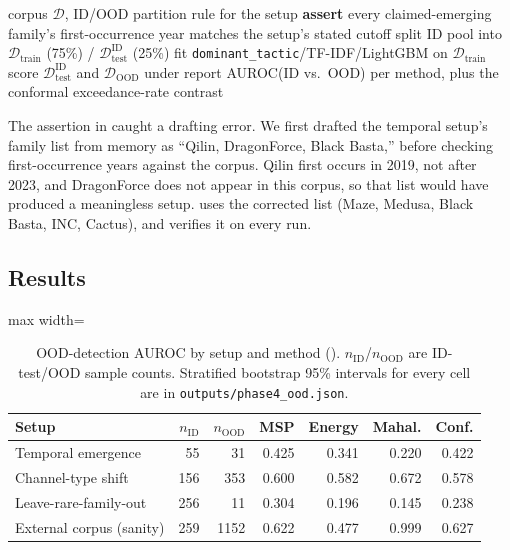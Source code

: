 \documentclass[preprint,12pt]{elsarticle}
\newenvironment{fittable}{\begin{adjustbox}{max width=\textwidth}}{\end{adjustbox}}
\begin{document}
\begin{algorithm}[htbp]
\caption{OOD setup evaluation}
\label{alg:ood-verify}
\begin{algorithmic}[1]
\Require corpus $\mathcal{D}$, ID/OOD partition rule for the setup
\State \textbf{assert} every claimed-emerging family's first-occurrence year matches the setup's stated cutoff 
\State split ID pool into $\mathcal{D}_{\mathrm{train}}$ (75\%) / $\mathcal{D}_{\mathrm{test}}^{\mathrm{ID}}$ (25\%)
\State fit \texttt{dominant\_tactic}/TF-IDF/LightGBM on $\mathcal{D}_{\mathrm{train}}$
\State score $\mathcal{D}_{\mathrm{test}}^{\mathrm{ID}}$ and $\mathcal{D}_{\mathrm{OOD}}$ under 
\State report AUROC(ID vs.\ OOD) per method, plus the conformal exceedance-rate contrast
\end{algorithmic}
\end{algorithm}

The assertion in  caught a drafting error. We first
drafted the temporal setup's family list from memory as ``Qilin, DragonForce,
Black Basta,'' before checking first-occurrence years against the corpus.
Qilin first occurs in 2019, not after 2023, and DragonForce does not appear in
this corpus, so that list would have produced a meaningless setup.
 uses the corrected list (Maze, Medusa, Black Basta, INC,
Cactus), and  verifies it on every run.

\subsection{Results}
\label{sec:ood-results}
\begin{table}[htbp]
\centering
\caption{OOD-detection AUROC by setup and method ().
  $n_{\mathrm{ID}}$/$n_{\mathrm{OOD}}$ are ID-test/OOD sample counts.
  Stratified bootstrap 95\% intervals for every cell are in
  \texttt{outputs/phase4\_ood.json}.}
\label{tab:ood}
\begin{fittable}
\begin{tabular}{lrrrrrr}
\toprule
Setup & $n_{\mathrm{ID}}$ & $n_{\mathrm{OOD}}$ & MSP & Energy & Mahal. & Conf. \\
\midrule
Temporal emergence     &  55 &   31 & 0.425 & 0.341 & 0.220 & 0.422 \\
Channel-type shift       & 156 &  353 & 0.600 & 0.582 & 0.672 & 0.578 \\
Leave-rare-family-out    & 256 &   11 & 0.304 & 0.196 & 0.145 & 0.238 \\
External corpus (sanity) & 259 & 1152 & 0.622 & 0.477 & 0.999 & 0.627 \\
\bottomrule
\end{tabular}
\end{fittable}
\end{table}
\end{document}
